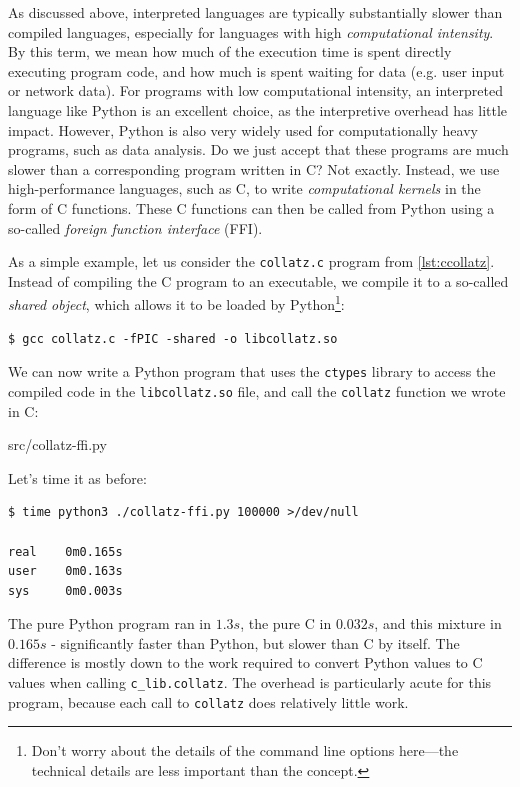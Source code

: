 As discussed above, interpreted languages are typically substantially
slower than compiled languages, especially for languages with high
\textit{computational intensity}.  By this term, we mean how much of
the execution time is spent directly executing program code, and how
much is spent waiting for data (e.g. user input or network data).  For
programs with low computational intensity, an interpreted language
like Python is an excellent choice, as the interpretive overhead has
little impact.  However, Python is also very widely used for
computationally heavy programs, such as data analysis.  Do we just
accept that these programs are much slower than a corresponding
program written in C?  Not exactly.  Instead, we use high-performance
languages, such as C, to write \textit{computational kernels} in the
form of C functions.  These C functions can then be called from Python
using a so-called \textit{foreign function interface} (FFI).

As a simple example, let us consider the \texttt{collatz.c} program
from \cref{lst:ccollatz}.  Instead of compiling the C program to an
executable, we compile it to a so-called \textit{shared object}, which
allows it to be loaded by Python\footnote{Don't worry about the
  details of the command line options here---the technical details are
  less important than the concept.}:

\begin{lstlisting}
$ gcc collatz.c -fPIC -shared -o libcollatz.so
\end{lstlisting}

We can now write a Python program that uses the \texttt{ctypes}
library to access the compiled code in the \texttt{libcollatz.so}
file, and call the \texttt{collatz} function we wrote in C:


{src/collatz-ffi.py}

Let's time it as before:

\begin{lstlisting}
$ time python3 ./collatz-ffi.py 100000 >/dev/null

real    0m0.165s
user    0m0.163s
sys     0m0.003s
\end{lstlisting}

The pure Python program ran in $1.3s$, the pure C in $0.032s$, and
this mixture in $0.165s$ - significantly faster than Python, but
slower than C by itself.  The difference is mostly down to the work
required to convert Python values to C values when calling
\texttt{c\_lib.collatz}.  The overhead is particularly acute for this
program, because each call to \texttt{collatz} does relatively little
work.


